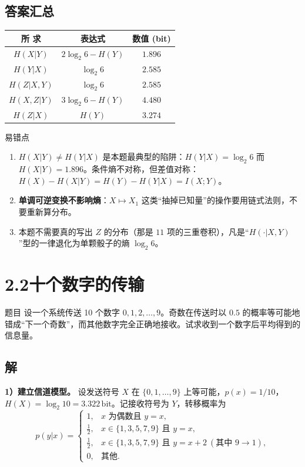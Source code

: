 \documentclass[11pt,a4paper]{ctexart}
\newcommand{\Hx}[1]{H\!\left(#1\right)}
\newcommand{\I}[1]{I\!\left(#1\right)}
\newcommand{\lb}{\log_{2}}
\newcommand{\bit}{\,\text{bit}}
\begin{document}
\subsection*{答案汇总}
\begin{center}
\renewcommand{\arraystretch}{1.3}
\begin{tabular}{c|c|c}
\toprule
所 求 & 表达式 & 数值 (bit)\\
\midrule
$\Hx{X|Y}$ & $2\lb 6-\Hx{Y}$ & $1.896$\\
$\Hx{Y|X}$ & $\lb 6$ & $2.585$\\
$\Hx{Z|X,Y}$ & $\lb 6$ & $2.585$\\
$\Hx{X,Z|Y}$ & $3\lb 6-\Hx{Y}$ & $4.480$\\
$\Hx{Z|X}$ & $\Hx{Y}$ & $3.274$\\
\bottomrule
\end{tabular}
\end{center}

\begin{keypoint}{易错点}
\begin{enumerate}[leftmargin=1.6em,itemsep=1pt,topsep=2pt]
  \item $\Hx{X|Y}\neq \Hx{Y|X}$ 是本题最典型的陷阱：$\Hx{Y|X}=\lb6$ 而 $\Hx{X|Y}=1.896$。条件熵不对称，但差值对称：$\Hx{X}-\Hx{X|Y}=\Hx{Y}-\Hx{Y|X}=\I{X;Y}$。
  \item \textbf{单调可逆变换不影响熵}：$X\mapsto X_1$ 这类“抽掉已知量”的操作要用链式法则，不要重新算分布。
  \item 本题不需要真的写出 $Z$ 的分布（那是 $11$ 项的三重卷积），凡是“$\Hx{\cdot|X,Y}$”型的一律退化为单颗骰子的熵 $\lb 6$。
\end{enumerate}
\end{keypoint}

\section*{2.2\quad 十个数字的传输}

\begin{problem}{题目}
设一个系统传送 10 个数字 $0,1,2,\dots,9$。奇数在传送时以 $0.5$ 的概率等可能地错成“下一个奇数”，而其他数字完全正确地接收。试求收到一个数字后平均得到的信息量。
\end{problem}

\subsection*{解}
\textbf{1）建立信道模型。} 设发送符号 $X$ 在 $\{0,1,\dots,9\}$ 上等可能，$p(x)=1/10$，$\Hx{X}=\lb 10=3.322\bit$。记接收符号为 $Y$，转移概率为
\[
p(y|x)=
\begin{cases}
1, & x \text{ 为偶数且 } y=x,\\[2pt]
\tfrac12, & x\in\{1,3,5,7,9\} \text{ 且 } y=x,\\[2pt]
\tfrac12, & x\in\{1,3,5,7,9\} \text{ 且 } y=x+2\ (\text{其中 } 9\to 1),\\[2pt]
0, & \text{其他}.
\end{cases}
\]
\end{document}

